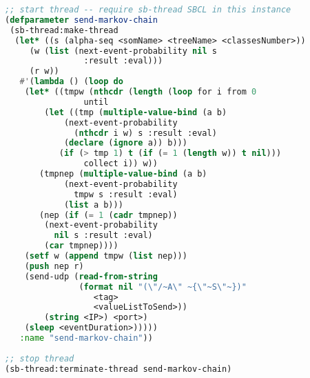  \smallskip
 
 \begin{lstlisting}[basicstyle=\footnotesize\ttfamily,language=Lisp]
;; start thread -- require sb-thread SBCL in this instance
(defparameter send-markov-chain
 (sb-thread:make-thread
  (let* ((s (alpha-seq <somName> <treeName> <classesNumber>))
	 (w (list (next-event-probability nil s 
	            :result :eval)))
	 (r w))
   #'(lambda () (loop do
    (let* ((tmpw (nthcdr (length (loop for i from 0
				until
		(let ((tmp (multiple-value-bind (a b)
			(next-event-probability 
			  (nthcdr i w) s :result :eval) 
			(declare (ignore a)) b)))
		   (if (> tmp 1) t (if (= 1 (length w)) t nil)))
				collect i)) w))
       (tmpnep (multiple-value-bind (a b)
	        (next-event-probability 
	          tmpw s :result :eval) 
	        (list a b)))
       (nep (if (= 1 (cadr tmpnep))
		(next-event-probability
		  nil s :result :eval)
		(car tmpnep))))
	(setf w (append tmpw (list nep)))
	(push nep r)
	(send-udp (read-from-string 
               (format nil "(\"/~A\" ~{\"~S\"~})"
                  <tag>
                  <valueListToSend>)) 
	    (string <IP>) <port>)
	(sleep <eventDuration>)))))
   :name "send-markov-chain"))
   
;; stop thread
(sb-thread:terminate-thread send-markov-chain)
\end{lstlisting}